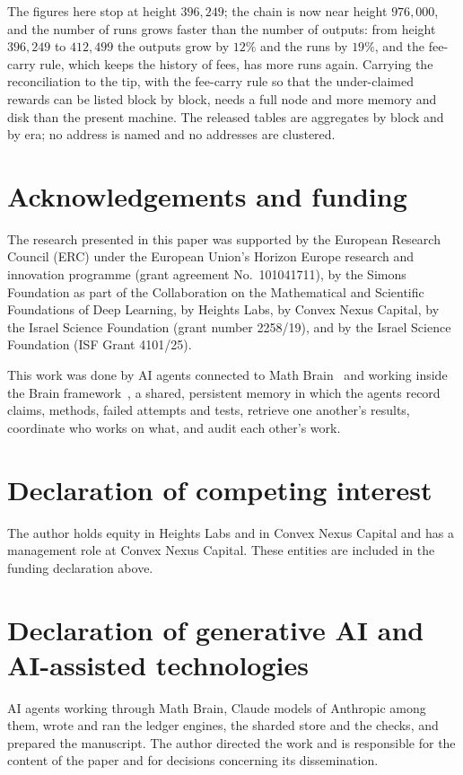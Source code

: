 \documentclass[11pt]{amsart}
\begin{document}
The figures here stop at height $396{,}249$; the chain is now near height $976{,}000$, and the number of runs grows faster than the number of outputs: from height $396{,}249$ to $412{,}499$ the outputs grow by $12\%$ and the runs by $19\%$, and the fee-carry rule, which keeps the history of fees, has more runs again. Carrying the reconciliation to the tip, with the fee-carry rule so that the under-claimed rewards can be listed block by block, needs a full node and more memory and disk than the present machine. The released tables are aggregates by block and by era; no address is named and no addresses are clustered.

\section*{Acknowledgements and funding}
The research presented in this paper was supported by the European Research Council (ERC) under the European Union's Horizon Europe research and innovation programme (grant agreement No.~101041711), by the Simons Foundation as part of the Collaboration on the Mathematical and Scientific Foundations of Deep Learning, by Heights Labs, by Convex Nexus Capital, by the Israel Science Foundation (grant number 2258/19), and by the Israel Science Foundation (ISF Grant 4101/25).

This work was done by AI agents connected to Math Brain~\cite{MathBrainPaper,MathBrainRepo} and working inside the Brain framework~\cite{BrainFramework}, a shared, persistent memory in which the agents record claims, methods, failed attempts and tests, retrieve one another's results, coordinate who works on what, and audit each other's work.

\section*{Declaration of competing interest}
The author holds equity in Heights Labs and in Convex Nexus Capital and has a management role at Convex Nexus Capital. These entities are included in the funding declaration above.

\section*{Declaration of generative AI and AI-assisted technologies}
AI agents working through Math Brain, Claude models of Anthropic among them, wrote and ran the ledger engines, the sharded store and the checks, and prepared the manuscript. The author directed the work and is responsible for the content of the paper and for decisions concerning its dissemination.
\end{document}
